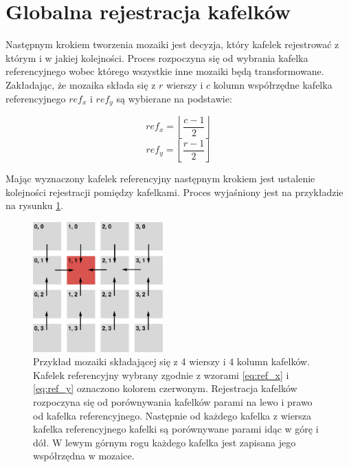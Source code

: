 \section{Globalna rejestracja kafelków}
\label{sec:proponowane_algorytmy:globalna_rejestracja}

Następnym krokiem tworzenia mozaiki jest decyzja, który kafelek rejestrować z którym i w jakiej kolejności. Proces rozpoczyna się od wybrania kafelka referencyjnego wobec którego wszystkie inne mozaiki będą transformowane. Zakładając, że mozaika składa się z $r$ wierszy i $c$ kolumn współrzędne kafelka referencyjnego $ref_x$ i $ref_y$ są wybierane na podstawie:

\begin{equation}
ref_x = \left \lfloor\frac{c - 1}{2}\right \rfloor
\label{eq:ref_x}
\end{equation}
\begin{equation}
ref_y = \left \lfloor\frac{r - 1}{2}\right \rfloor
\label{eq:ref_y}
\end{equation}

Mając wyznaczony kafelek referencyjny następnym krokiem jest ustalenie kolejności rejestracji pomiędzy kafelkami. Proces wyjaśniony jest na przykładzie na rysunku \ref{fig:proponowane_algorytmy:global_registration}.

\begin{figure}[H]
  \centering
  \includegraphics[width=5cm]{gfx/global_registration}
  \caption{Przykład mozaiki składającej się z 4 wierszy i 4 kolumn kafelków. Kafelek referencyjny wybrany zgodnie z wzorami \ref{eq:ref_x} i \ref{eq:ref_y} oznaczono kolorem czerwonym. Rejestracja kafelków rozpoczyna się od porównywania kafelków parami na lewo i prawo od kafelka referencyjnego. Następnie od każdego kafelka z wiersza kafelka referencyjnego kafelki są porównywane parami idąc w górę i dół. W lewym górnym rogu każdego kafelka jest zapisana jego współrzędna w mozaice.}
  \label{fig:proponowane_algorytmy:global_registration}
\end{figure}

